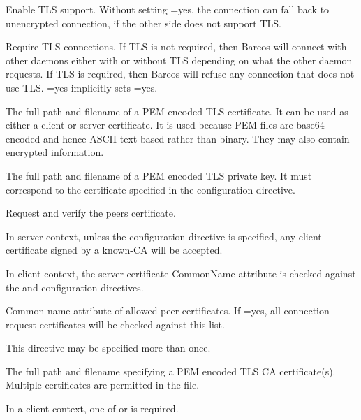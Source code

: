\begin{description}
%
Enable TLS support. Without setting =yes,
the connection can fall back to unencrypted connection,
if the other side does not support TLS.

%
Require TLS connections.
If TLS is not required,
then Bareos will connect with other daemons either with or without TLS depending
on what the other daemon requests.
If TLS is required,
then Bareos will refuse any connection that does not use TLS.
=yes  implicitly sets =yes.

%
The full path and filename of a PEM encoded TLS certificate.  It can be
used as either a client or server certificate.
It is used because PEM files are base64 encoded and hence ASCII
text based rather than binary.
They may also contain encrypted information.

%
The full path and filename of a PEM encoded TLS private key.  It must
correspond to the certificate specified in the  configuration directive.

%
Request and verify the peers certificate.

In server context, unless the  configuration directive is specified,
any client certificate signed by a known-CA will be accepted.

In client context, the server certificate CommonName attribute is checked against
the  and  configuration directives.


%
Common name attribute of allowed peer certificates.
If =yes, all connection request certificates
will be checked against this list.

This directive may be specified more than once.


%
The full path and filename specifying a
PEM encoded TLS CA certificate(s).  Multiple certificates are
permitted in the file.

In a client context, one of
 or 
is required.


\end{description}

